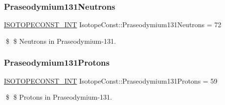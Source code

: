 \subsubsection{\texorpdfstring{Praseodymium131\+Neutrons}{Praseodymium131Neutrons}}
{\footnotesize\ttfamily \mbox{\hyperlink{group___isotope_const-_macros_ga5f18360b3e99483a35c32d789e62621c}{I\+S\+O\+T\+O\+P\+E\+C\+O\+N\+S\+T\+\_\+\+I\+NT}} Isotope\+Const\+::\+Praseodymium131\+Neutrons = 72}

\$ \$ Neutrons in Praseodymium-\/131. \mbox{\label{group___isotope_const-_praseodymium-_pr131_ga0e26e55b53c10d6392efb8b0716564af}} 
\subsubsection{\texorpdfstring{Praseodymium131\+Protons}{Praseodymium131Protons}}
{\footnotesize\ttfamily \mbox{\hyperlink{group___isotope_const-_macros_ga5f18360b3e99483a35c32d789e62621c}{I\+S\+O\+T\+O\+P\+E\+C\+O\+N\+S\+T\+\_\+\+I\+NT}} Isotope\+Const\+::\+Praseodymium131\+Protons = 59}

\$ \$ Protons in Praseodymium-\/131. 